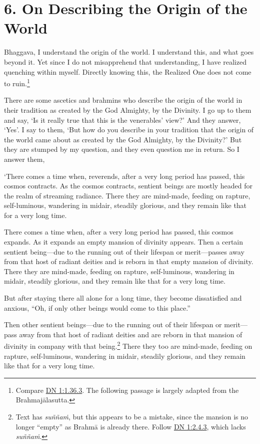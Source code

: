 \documentclass[12pt,openany]{book}%
\begin{document}
\section*{6. On Describing the Origin of the World }

Bhaggava, I understand the origin of the world. I understand this, and what goes beyond it. Yet since I do not misapprehend that understanding, I have realized quenching within myself. Directly knowing this, the Realized One does not come to ruin.\footnote{Compare \href{https://suttacentral.net/dn1/en/sujato\#1.36.3}{DN 1:1.36.3}. The following passage is largely adapted from the \textsanskrit{Brahmajālasutta}. } 

There are some ascetics and brahmins who describe the origin of the world in their tradition as created by the God Almighty, by the Divinity. I go up to them and say, ‘Is it really true that this is the venerables’ view?’ And they answer, ‘Yes’. I say to them, ‘But how do you describe in your tradition that the origin of the world came about as created by the God Almighty, by the Divinity?’ But they are stumped by my question, and they even question me in return. So I answer them, 

‘There comes a time when, reverends, after a very long period has passed, this cosmos contracts. As the cosmos contracts, sentient beings are mostly headed for the realm of streaming radiance. There they are mind-made, feeding on rapture, self-luminous, wandering in midair, steadily glorious, and they remain like that for a very long time. 

There comes a time when, after a very long period has passed, this cosmos expands. As it expands an empty mansion of divinity appears. Then a certain sentient being—due to the running out of their lifespan or merit—passes away from that host of radiant deities and is reborn in that empty mansion of divinity. There they are mind-made, feeding on rapture, self-luminous, wandering in midair, steadily glorious, and they remain like that for a very long time. 

But after staying there all alone for a long time, they become dissatisfied and anxious, “Oh, if only other beings would come to this place.” 

Then other sentient beings—due to the running out of their lifespan or merit—pass away from that host of radiant deities and are reborn in that mansion of divinity in company with that being.\footnote{Text has \textit{\textsanskrit{suññaṁ}}, but this appears to be a mistake, since the mansion is no longer “empty” as \textsanskrit{Brahmā} is already there. Follow \href{https://suttacentral.net/dn1/en/sujato\#2.4.3}{DN 1:2.4.3}, which lacks \textit{\textsanskrit{suññaṁ}}. } There they too are mind-made, feeding on rapture, self-luminous, wandering in midair, steadily glorious, and they remain like that for a very long time. 
\end{document}
